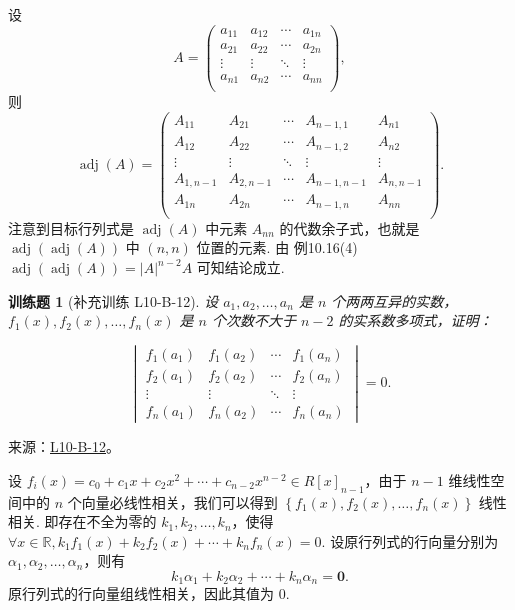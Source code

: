 \documentclass[12pt,fontset=fandol]{ctexart}
\newtheorem{exercise}{训练题}[section]
\begin{document}
\begin{solve}
设 \[A = \begin{pmatrix}
                a_{11} & a_{12} & \cdots & a_{1n} \\
                a_{21} & a_{22} & \cdots & a_{2n} \\
                \vdots & \vdots & \ddots & \vdots \\
                a_{n1} & a_{n2} & \cdots & a_{nn} \\
            \end{pmatrix},\]
            则 \[\operatorname{adj}(A) = \begin{pmatrix}
                    A_{11}     & A_{21}     & \cdots & A_{n-1, 1}   & A_{n1}     \\
                    A_{12}     & A_{22}     & \cdots & A_{n-1, 2}   & A_{n2}     \\
                    \vdots     & \vdots     & \ddots & \vdots       & \vdots     \\
                    A_{1, n-1} & A_{2, n-1} & \cdots & A_{n-1, n-1} & A_{n, n-1} \\
                    A_{1n}     & A_{2n}     & \cdots & A_{n-1, n}   & A_{nn}     \\
                \end{pmatrix}.\]
            注意到目标行列式是 $\operatorname{adj}(A)$ 中元素 $A_{nn}$ 的代数余子式，也就是 $\operatorname{adj}(\operatorname{adj}(A))$ 中 $(n, n)$ 位置的元素. 由 {例10.16(4)} $\operatorname{adj}(\operatorname{adj}(A)) = \lvert A \rvert^{n-2}A$ 可知结论成立.
\end{solve}

\begin{exercise}[补充训练 L10-B-12]\label{prob:L10-B-12}
设 $a_1,a_2,\ldots,a_n$ 是 $n$ 个两两互异的实数，$f_1(x),f_2(x),\ldots,f_n(x)$ 是 $n$ 个次数不大于 $n-2$ 的实系数多项式，证明：

        \[\begin{vmatrix}
                f_1(a_1) & f_1(a_2) & \cdots & f_1(a_n) \\
                f_2(a_1) & f_2(a_2) & \cdots & f_2(a_n) \\
                \vdots   & \vdots   & \ddots & \vdots   \\
                f_n(a_1) & f_n(a_2) & \cdots & f_n(a_n)
            \end{vmatrix}=0.\]
\end{exercise}
\noindent 来源：\href{https://github.com/yhwu-is/Linear-Algebra-Left-Undone/blob/new/%E8%AE%B2%E4%B9%89/%E4%B8%93%E9%A2%98/10%20%E8%A1%8C%E5%88%97%E5%BC%8F.tex}{L10-B-12}。
\begin{solve}
设 $f_i(x) = c_0 + c_1 x + c_2 x^2 + \cdots + c_{n-2} x^{n-2} \in R[x]_{n-1}$，由于 $n-1$ 维线性空间中的 $n$ 个向量必线性相关，我们可以得到 $\left\{ f_1(x), f_2(x), \ldots, f_n(x) \right\}$ 线性相关. 即存在不全为零的 $k_1, k_2, \ldots, k_n$，使得 $\forall x \in \mathbb{R}, k_1 f_1(x) + k_2 f_2(x) + \cdots + k_n f_n(x) = 0$. 设原行列式的行向量分别为 $\alpha_1, \alpha_2, \ldots, \alpha_n$，则有
            \[
                k_1 \alpha_1 + k_2 \alpha_2 + \cdots + k_n \alpha_n = \mathbf{0}.
            \]
            原行列式的行向量组线性相关，因此其值为 $0$.
\end{solve}
\end{document}

